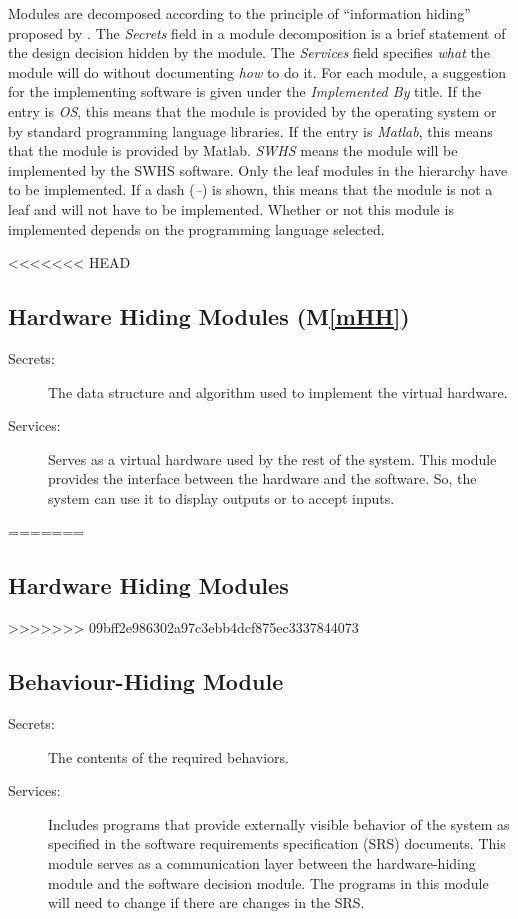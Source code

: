 \documentclass[12pt]{article}
\newcommand{\mref}[1]{M\ref{#1}}
\begin{document}
Modules are decomposed according to the principle of ``information hiding''
proposed by \citet{ParnasEtAl1984}. The \emph{Secrets} field in a module
decomposition is a brief statement of the design decision hidden by the
module. The \emph{Services} field specifies \emph{what} the module will do
without documenting \emph{how} to do it. For each module, a suggestion for the
implementing software is given under the \emph{Implemented By} title. If the
entry is \emph{OS}, this means that the module is provided by the operating
system or by standard programming language libraries. If the entry is
\emph{Matlab}, this means that the module is provided by Matlab.  \emph{SWHS} means the
module will be implemented by the SWHS software.  
Only the leaf modules in the
hierarchy have to be implemented. If a dash (\emph{--}) is shown, this means
that the module is not a leaf and will not have to be implemented. Whether or
not this module is implemented depends on the programming language
selected.

<<<<<<< HEAD
\subsection{Hardware Hiding Modules (\mref{mHH})}

\begin{description}
\item[Secrets:]The data structure and algorithm used to implement the virtual
  hardware.
\item[Services:]Serves as a virtual hardware used by the rest of the
  system. This module provides the interface between the hardware and the
  software. So, the system can use it to display outputs or to accept inputs.
\end{description}
=======
\subsection{Hardware Hiding Modules}
>>>>>>> 09bff2e986302a97c3ebb4dcf875ec3337844073

\subsection{Behaviour-Hiding Module}

\begin{description}
\item[Secrets:]The contents of the required behaviors.
\item[Services:]Includes programs that provide externally visible behavior of
  the system as specified in the software requirements specification (SRS)
  documents. This module serves as a communication layer between the
  hardware-hiding module and the software decision module. The programs in this
  module will need to change if there are changes in the SRS.
\end{description}
\end{document}
